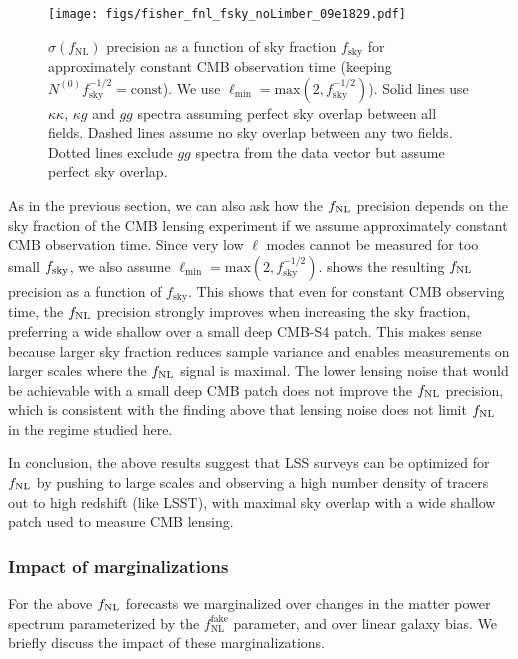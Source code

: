 \documentclass[prd,superscriptaddress,floatfix,notitlepage,nofootinbib,reprint]{revtex4-1} %
\begin{document}
\begin{figure}[tbp]
\texttt{[image: figs/fisher\_fnl\_fsky\_noLimber\_09e1829.pdf]}
\caption{
$\sigma(f_\mathrm{NL})$ precision as a function of sky fraction $f_\mathrm{sky}$ for approximately constant CMB observation time (keeping $N^{(0)}f_\mathrm{sky}^{-1/2}=\mathrm{const}$). We use $\ell_\mathrm{min}=\mathrm{max}(2,f_\mathrm{sky}^{-1/2})$).
Solid lines use $\kappa\kappa$, $\kappa g$ and $gg$ spectra assuming perfect sky overlap between all fields.
Dashed lines assume no sky overlap between any two fields. 
Dotted lines exclude $gg$ spectra from the data vector but assume perfect sky overlap. 
}
\label{fig:fnl_fsky}
\end{figure}

As in the previous section, we can also ask how the ${f_\mathrm{NL}}$ precision depends on the sky fraction of the CMB lensing experiment if we assume approximately constant CMB observation time.
Since very low $\ell$ modes cannot be measured for too small ${f_\mathrm{sky}}$, we also assume $\ell_\mathrm{min}=\mathrm{max}(2,f_\mathrm{sky}^{-1/2})$.
 shows the resulting ${f_\mathrm{NL}}$ precision as a function of $f_\mathrm{sky}$.
This shows that even for constant CMB observing time, the ${f_\mathrm{NL}}$ precision strongly improves when increasing the sky fraction, preferring a wide shallow over a small deep CMB-S4 patch.
This makes sense because larger sky fraction reduces sample variance and enables measurements on larger scales where the ${f_\mathrm{NL}}$ signal is maximal. 
The lower lensing noise that would be achievable with a small deep CMB patch does not improve the ${f_\mathrm{NL}}$ precision, which is consistent with the finding above that lensing noise does not limit ${f_\mathrm{NL}}$ in the regime studied here.

In conclusion, the above results suggest that LSS surveys can be optimized for ${f_\mathrm{NL}}$ by  pushing to large scales and observing a high number density of tracers out to high redshift (like LSST), with maximal sky overlap with a wide shallow patch used to measure CMB lensing.



\subsubsection{Impact of marginalizations}
For the above ${f_\mathrm{NL}}$ forecasts we marginalized over changes in the matter power spectrum parameterized by the $f_\mathrm{NL}^\mathrm{fake}$ parameter, and over linear galaxy bias. 
We briefly discuss the impact of these marginalizations.
\end{document}
